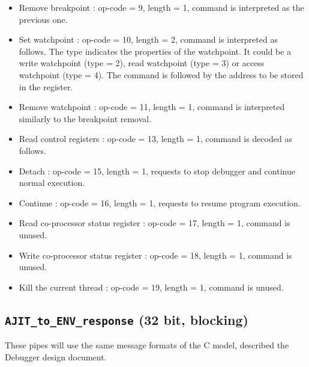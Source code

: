 \documentclass[a4paper, 11pt]{article}
\begin{document}
\begin{itemize}
		\begin{figure}[h!]
			\centering
		\end{figure}
		
		\item Remove breakpoint : op-code = 9, length = 1, command is interpreted as the previous one.
		
		\item Set watchpoint : op-code = 10, length = 2, command is interpreted as follows. The type indicates the properties of the watchpoint. It could be a write watchpoint (type = 2), read watchpoint (type = 3) or access watchpoint (type = 4). The command is followed by the address to be stored in the register.
		
		\begin{figure}[h!]
					\centering
				\end{figure}
		
		\item Remove watchpoint : op-code = 11, length = 1, command is interpreted similarly to the breakpoint removal.
		
		\item Read control registers : op-code = 13, length = 1, command is decoded as follows.

		\begin{figure}[h!]
			\centering
		\end{figure}
				
		\item Detach : op-code = 15, length = 1, requests to stop debugger and continue normal execution.
		
		\item Continue : op-code = 16, length = 1, requests to resume program execution.
		
		\item Read co-processor status register : op-code = 17, length = 1, command is unused.
		
		\item Write co-processor status register : op-code = 18, length = 1, command is unused.
		
		\item Kill the current thread : op-code = 19, length = 1, command is unused.
		
\end{itemize}

\subsection{\texttt{AJIT\_to\_ENV\_response} (32 bit, blocking) }
These pipes will use the same message formats of the C model, described the Debugger design document\cite{main_doc}.
\end{document}
